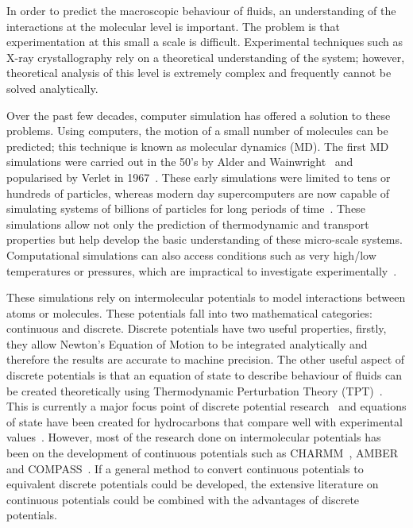 \documentclass[12pt]{UoAthesis} \usepackage{booktabs}
\begin{document}
In order to predict the macroscopic behaviour of fluids, an
understanding of the interactions at the molecular level is important.
The problem is that experimentation at this small a scale is
difficult. Experimental techniques such as X-ray crystallography rely
on a theoretical understanding of the system; however, theoretical
analysis of this level is extremely complex and frequently cannot be
solved analytically.   

Over the past few decades, computer simulation has offered a solution
to these problems.  Using computers, the motion of a small number of
molecules can be predicted; this technique is known as molecular
dynamics (MD).  The first MD simulations were carried out in the 50's
by Alder and Wainwright~\cite{Alder1957} and popularised by Verlet in
1967~\cite{Verlet1967}.  These early simulations were limited to tens
or hundreds of particles, whereas modern day supercomputers are now
capable of simulating systems of billions of particles for long
periods of time~\cite{Allsopp2012}.  These simulations allow not only
the prediction of thermodynamic and transport properties but help
develop the basic understanding of these micro-scale systems.
Computational simulations can also access conditions such as very
high/low temperatures or pressures, which are impractical to
investigate experimentally~\cite{Mandumpal2011}.

These simulations rely on intermolecular potentials to model
interactions between atoms or molecules.  These potentials fall into
two mathematical categories: continuous and discrete.  Discrete
potentials have two useful properties, firstly, they allow Newton's
Equation of Motion to be integrated analytically and therefore the
results are accurate to machine precision.  The other useful aspect of
discrete potentials is that an equation of state to describe behaviour
of fluids can be created theoretically using Thermodynamic
Perturbation Theory (TPT)~\cite{Benavides1999, Barker1967}.  This is
currently a major focus point of discrete potential
research~\cite{Vidales2001, Chapela2010, ElliotJr2002, Unlu2004} and
equations of state have been created for hydrocarbons that compare
well with experimental values~\cite{ElliotJr2002, Unlu2004}.
 However, most
of the research done on intermolecular potentials has been on the
development of continuous potentials such as
CHARMM~\cite{MacKerell1998}, AMBER~\cite{Ponder2003} and
COMPASS~\cite{McQuaid2004}.  If a general method to convert continuous
potentials to equivalent discrete potentials could be developed, the
extensive literature on continuous potentials could be combined with
the advantages of discrete potentials.
\end{document}
